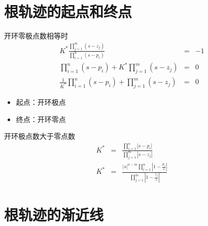 \section{根轨迹的起点和终点}
\begin{frame}{开环零极点数相等时}
\begin{eqnarray}
K^{\ast}\frac{\prod\limits_{j=1}^m(s-z_j)}{\prod\limits_{i=1}^n(s-p_i)} &=& -1  \\
{\prod\limits_{i=1}^n(s-p_i)}+K^{*}{\prod\limits_{j=1}^m(s-z_j)} &=& 0 \\
\frac{1}{K^{*}}{\prod\limits_{i=1}^n(s-p_i)}+{\prod\limits_{j=1}^m(s-z_j)} &=& 0
\end{eqnarray}
\begin{itemize}
\item 起点：开环极点
\item 终点：开环零点
\end{itemize}
\end{frame}

\begin{frame}{开环极点数大于零点数}
\begin{eqnarray}
K^* &=& \frac{\prod\limits_{i=1}^n|s-p_i|}{\prod\limits_{j=1}^m|s-z_j|} \\
K^* &=& \frac{|s|^{n-m}\prod\limits_{i=1}^n|1-\frac{p_i}{s}|}{\prod\limits_{j=1}^m|1-\frac{z_j}{s}|} 
\end{eqnarray}
\end{frame}


\section{根轨迹的渐近线}

